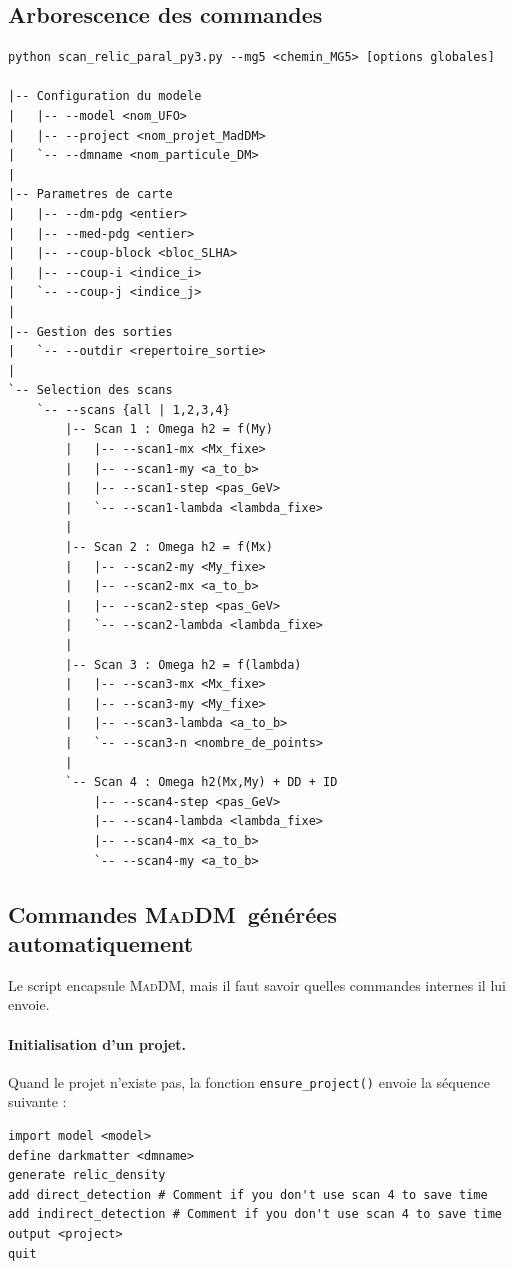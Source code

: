 \documentclass[11pt,a4paper]{article}
\newcommand{\mad}{\textsc{MadDM}}
\begin{document}
\subsection{Arborescence des commandes}

\begin{lstlisting}[style=bashstyle]
python scan_relic_paral_py3.py --mg5 <chemin_MG5> [options globales]

|-- Configuration du modele
|   |-- --model <nom_UFO>
|   |-- --project <nom_projet_MadDM>
|   `-- --dmname <nom_particule_DM>
|
|-- Parametres de carte
|   |-- --dm-pdg <entier>
|   |-- --med-pdg <entier>
|   |-- --coup-block <bloc_SLHA>
|   |-- --coup-i <indice_i>
|   `-- --coup-j <indice_j>
|
|-- Gestion des sorties
|   `-- --outdir <repertoire_sortie>
|
`-- Selection des scans
    `-- --scans {all | 1,2,3,4}
        |-- Scan 1 : Omega h2 = f(My)
        |   |-- --scan1-mx <Mx_fixe>
        |   |-- --scan1-my <a_to_b>
        |   |-- --scan1-step <pas_GeV>
        |   `-- --scan1-lambda <lambda_fixe>
        |
        |-- Scan 2 : Omega h2 = f(Mx)
        |   |-- --scan2-my <My_fixe>
        |   |-- --scan2-mx <a_to_b>
        |   |-- --scan2-step <pas_GeV>
        |   `-- --scan2-lambda <lambda_fixe>
        |
        |-- Scan 3 : Omega h2 = f(lambda)
        |   |-- --scan3-mx <Mx_fixe>
        |   |-- --scan3-my <My_fixe>
        |   |-- --scan3-lambda <a_to_b>
        |   `-- --scan3-n <nombre_de_points>
        |
        `-- Scan 4 : Omega h2(Mx,My) + DD + ID
            |-- --scan4-step <pas_GeV>
            |-- --scan4-lambda <lambda_fixe>
            |-- --scan4-mx <a_to_b>
            `-- --scan4-my <a_to_b>
\end{lstlisting}

\subsection{Commandes \mad\ générées automatiquement}

Le script encapsule \mad, mais il faut savoir quelles commandes internes il lui envoie.

\paragraph{Initialisation d'un projet.}
Quand le projet n'existe pas, la fonction \texttt{ensure\_project()} envoie la séquence suivante :
\begin{lstlisting}[style=bashstyle]
import model <model>
define darkmatter <dmname>
generate relic_density
add direct_detection # Comment if you don't use scan 4 to save time
add indirect_detection # Comment if you don't use scan 4 to save time
output <project>
quit
\end{lstlisting}
\end{document}
